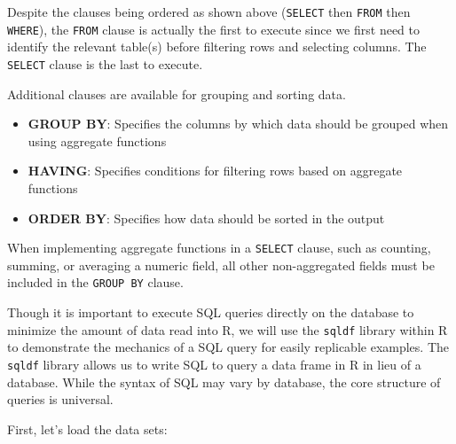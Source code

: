 \documentclass[]{book}
\providecommand{\tightlist}{%
  \setlength{\itemsep}{0pt}\setlength{\parskip}{0pt}}
\begin{document}
Despite the clauses being ordered as shown above (\texttt{SELECT} then \texttt{FROM} then \texttt{WHERE}), the \texttt{FROM} clause is actually the first to execute since we first need to identify the relevant table(s) before filtering rows and selecting columns. The \texttt{SELECT} clause is the last to execute.

Additional clauses are available for grouping and sorting data.

\begin{itemize}
\tightlist
\item
  \textbf{GROUP BY}: Specifies the columns by which data should be grouped when using aggregate functions
\item
  \textbf{HAVING}: Specifies conditions for filtering rows based on aggregate functions
\item
  \textbf{ORDER BY}: Specifies how data should be sorted in the output
\end{itemize}

When implementing aggregate functions in a \texttt{SELECT} clause, such as counting, summing, or averaging a numeric field, all other non-aggregated fields must be included in the \texttt{GROUP\ BY} clause.

Though it is important to execute SQL queries directly on the database to minimize the amount of data read into R, we will use the \texttt{sqldf} library within R to demonstrate the mechanics of a SQL query for easily replicable examples. The \texttt{sqldf} library allows us to write SQL to query a data frame in R in lieu of a database. While the syntax of SQL may vary by database, the core structure of queries is universal.

First, let's load the data sets:
\end{document}
